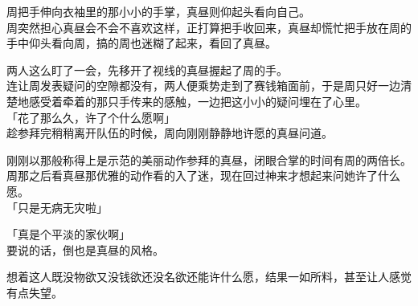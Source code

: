周把手伸向衣袖里的那小小的手掌，真昼则仰起头看向自己。\\

周突然担心真昼会不会不喜欢这样，正打算把手收回来，真昼却慌忙把手放在周的手中仰头看向周，搞的周也迷糊了起来，看回了真昼。

两人这么盯了一会，先移开了视线的真昼握起了周的手。\\

连让周发表疑问的空隙都没有，两人便乘势走到了赛钱箱面前，于是周只好一边清楚地感受着牵着的那只手传来的感触，一边把这小小的疑问埋在了心里。\\



「花了那么久，许了个什么愿啊」\\

趁参拜完稍稍离开队伍的时候，周向刚刚静静地许愿的真昼问道。

刚刚以那般称得上是示范的美丽动作参拜的真昼，闭眼合掌的时间有周的两倍长。周那之后看真昼那优雅的动作看的入了迷，现在回过神来才想起来问她许了什么愿。\\

「只是无病无灾啦」

「真是个平淡的家伙啊」\\

要说的话，倒也是真昼的风格。

想着这人既没物欲又没钱欲还没名欲还能许什么愿，结果一如所料，甚至让人感觉有点失望。\\

